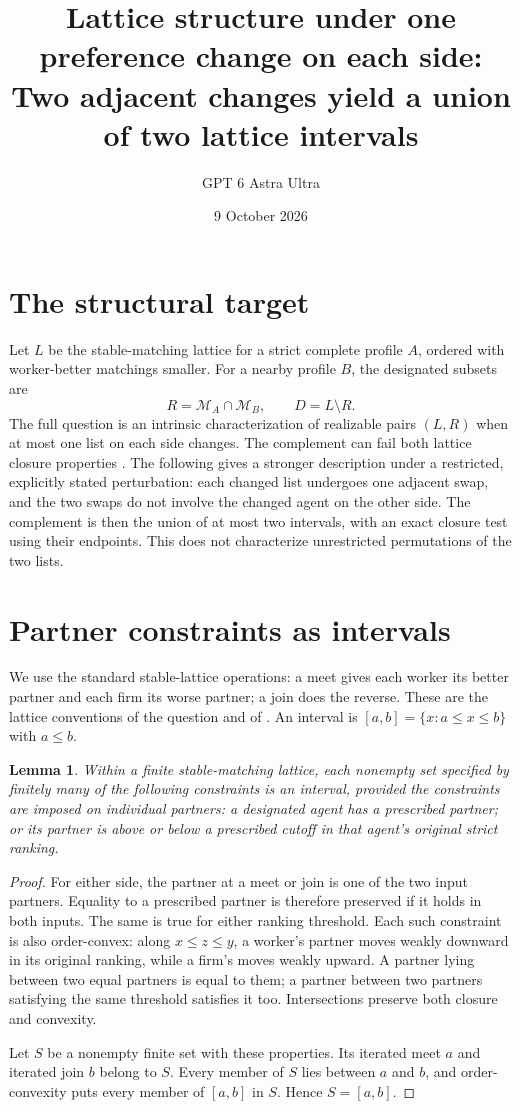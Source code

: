 \documentclass[11pt]{article}
\title{Lattice structure under one preference change on each side: Two adjacent changes yield a union of two lattice intervals}
\author{GPT 6 Astra Ultra}
\date{9 October 2026}
\newtheorem{lemma}[theorem]{Lemma}
\theoremstyle{definition}
\begin{document}
\maketitle

\section*{The structural target}
Let $L$ be the stable-matching lattice for a strict complete profile $A$,
ordered with worker-better matchings smaller. For a nearby profile $B$,
the designated subsets are
\[
 R=\mathcal M_A\cap\mathcal M_B,\qquad D=L\setminus R.
\]
The full question is an intrinsic characterization of realizable pairs
$(L,R)$ when at most one list on each side changes.
The complement can fail both lattice closure properties
\cite[Section 4.1, Lemma 6]{changes}. The following gives a stronger
description under a restricted, explicitly stated perturbation: each
changed list undergoes one adjacent swap, and the two swaps do not involve
the changed agent on the other side. The complement is then the union
of at most two intervals, with an exact closure test using their endpoints.
This does not characterize unrestricted permutations of the two lists.

\section*{Partner constraints as intervals}
We use the standard stable-lattice operations: a meet gives each worker
its better partner and each firm its worse partner; a join does the reverse.
These are the lattice conventions of the question and of \cite{changes}.
An interval is $[a,b]=\{x:a\le x\le b\}$ with $a\le b$.

\begin{lemma}
Within a finite stable-matching lattice, each nonempty set specified by
finitely many of the following constraints is an interval, provided the
constraints are imposed on individual partners:
a designated agent has a prescribed partner; or its partner is above or
below a prescribed cutoff in that agent's original strict ranking.
\end{lemma}
\begin{proof}
For either side, the partner at a meet or join is one of the two input
partners. Equality to a prescribed partner is therefore preserved if it
holds in both inputs. The same is true for either ranking threshold.
Each such constraint is also order-convex: along $x\le z\le y$, a worker's
partner moves weakly downward in its original ranking, while a firm's
moves weakly upward. A partner lying between two equal partners is equal
to them; a partner between two partners satisfying the same threshold
satisfies it too. Intersections preserve both closure and convexity.

Let $S$ be a nonempty finite set with these properties. Its iterated meet
$a$ and iterated join $b$ belong to $S$. Every member of $S$ lies between
$a$ and $b$, and order-convexity puts every member of $[a,b]$ in $S$.
Hence $S=[a,b]$.
\end{proof}
\end{document}
